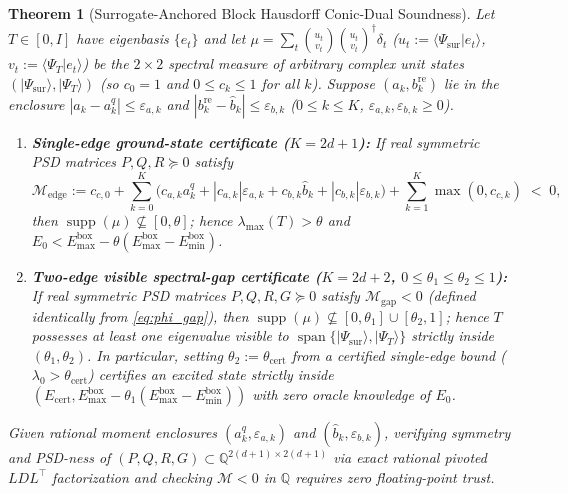 \documentclass[11pt,a4paper]{article}
\newtheorem{theorem}{Theorem}[section]
\theoremstyle{definition}
\DeclareMathOperator{\supp}{supp}
\newcommand{\Q}{\mathbb{Q}}
\newcommand{\ket}[1]{\lvert #1 \rangle}
\newcommand{\braket}[2]{\langle #1 \vert #2 \rangle}
\begin{document}
\begin{theorem}[Surrogate-Anchored Block Hausdorff Conic-Dual Soundness]\label{thm:hausdorff}
Let $T \in [0, I]$ have eigenbasis $\{e_t\}$ and let $\mu = \sum_t \binom{u_t}{v_t}\binom{u_t}{v_t}^\dagger \delta_t$ ($u_t := \braket{\Psi_{\mathrm{sur}}}{e_t}$, $v_t := \braket{\Psi_T}{e_t}$) be the $2\times 2$ spectral measure of arbitrary complex unit states $(\ket{\Psi_{\mathrm{sur}}}, \ket{\Psi_T})$ (so $c_0 = 1$ and $0 \le c_k \le 1$ for all $k$). Suppose $(a_k, b_k^{\mathrm{re}})$ lie in the enclosure $|a_k - a_k^q| \le \varepsilon_{a,k}$ and $|b_k^{\mathrm{re}} - \hat{b}_k| \le \varepsilon_{b,k}$ ($0 \le k \le K$, $\varepsilon_{a,k}, \varepsilon_{b,k} \ge 0$).
\begin{enumerate}[label=(\roman*),leftmargin=1.8em]
  \item \textbf{Single-edge ground-state certificate ($K = 2d+1$):} If real symmetric PSD matrices $P,Q,R \succeq 0$ satisfy
  \[
    \mathcal{M}_{\mathrm{edge}} := c_{c,0} + \sum_{k=0}^K \big(c_{a,k} a_k^q + |c_{a,k}|\varepsilon_{a,k} + c_{b,k} \hat{b}_k + |c_{b,k}|\varepsilon_{b,k}\big) + \sum_{k=1}^K \max(0, c_{c,k}) \;<\; 0,
  \]
  then $\supp(\mu) \not\subseteq [0, \theta]$; hence $\lambda_{\max}(T) > \theta$ and $E_0 < E_{\max}^{\mathrm{box}} - \theta(E_{\max}^{\mathrm{box}} - E_{\min}^{\mathrm{box}})$.
  \item \textbf{Two-edge visible spectral-gap certificate ($K = 2d+2$, $0 \le \theta_1 \le \theta_2 \le 1$):} If real symmetric PSD matrices $P,Q,R,G \succeq 0$ satisfy $\mathcal{M}_{\mathrm{gap}} < 0$ (defined identically from \eqref{eq:phi_gap}), then $\supp(\mu) \not\subseteq [0, \theta_1] \cup [\theta_2, 1]$; hence $T$ possesses at least one eigenvalue visible to $\operatorname{span}\{\ket{\Psi_{\mathrm{sur}}}, \ket{\Psi_T}\}$ strictly inside $(\theta_1, \theta_2)$. In particular, setting $\theta_2 := \theta_{\mathrm{cert}}$ from a certified single-edge bound ($\lambda_0 > \theta_{\mathrm{cert}}$) certifies an \emph{excited} state strictly inside $(E_{\mathrm{cert}}, E_{\max}^{\mathrm{box}} - \theta_1(E_{\max}^{\mathrm{box}} - E_{\min}^{\mathrm{box}}))$ with zero oracle knowledge of $E_0$.
\end{enumerate}
Given rational moment enclosures $(a_k^q, \varepsilon_{a,k})$ and $(\hat{b}_k, \varepsilon_{b,k})$, verifying symmetry and PSD-ness of $(P,Q,R,G) \subset \Q^{2(d+1)\times 2(d+1)}$ via exact rational pivoted $LDL^\top$ factorization and checking $\mathcal{M} < 0$ in $\Q$ requires zero floating-point trust.
\end{theorem}
\end{document}
